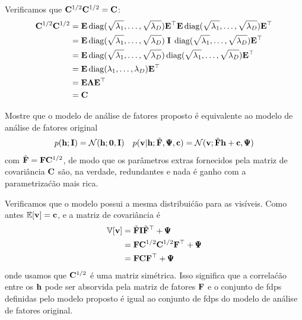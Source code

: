 \begin{exenumerate}
    \begin{solution}
        Verificamos que $\mathbf{C}^{1/2}\mathbf{C}^{1/2} = \mathbf{C}$:
        \begin{align}
            \mathbf{C}^{1/2} \mathbf{C}^{1/2} & = \mathbf{E} \operatorname{diag}(\sqrt{\lambda_1}, \ldots, \sqrt{\lambda_D})\mathbf{E}^\top \mathbf{E} \operatorname{diag}(\sqrt{\lambda_1}, \ldots, \sqrt{\lambda_D})\mathbf{E}^\top\\
            & = \mathbf{E} \operatorname{diag}(\sqrt{\lambda_1}, \ldots, \sqrt{\lambda_D}) \; \mathbf{I} \; \operatorname{diag}(\sqrt{\lambda_1}, \ldots, \sqrt{\lambda_D})\mathbf{E}^\top\\
            &= \mathbf{E} \operatorname{diag}(\sqrt{\lambda_1}, \ldots, \sqrt{\lambda_D}) \operatorname{diag}(\sqrt{\lambda_1}, \ldots, \sqrt{\lambda_D})\mathbf{E}^\top\\
            &= \mathbf{E} \operatorname{diag}(\lambda_1, \ldots, \lambda_D) \mathbf{E}^\top\\
            &= \mathbf{E} \mathbf{\Lambda} \mathbf{E}^\top\\
            & =\mathbf{C}
        \end{align}
        
    \end{solution}
    
    \item Mostre que o modelo de an\'alise de fatores proposto \'e equivalente ao modelo de an\'alise de fatores original
    \begin{align}
        p(\mathbf{h}; \mathbf{I}) &= \mathcal{N}(\mathbf{h}; \boldsymbol{0}, \mathbf{I}) & p(\mathbf{v} | \mathbf{h}; \tilde{\mathbf{F}}, \pmb{\Psi}, \mathbf{c}) = \mathcal{N}(\mathbf{v}; \tilde{\mathbf{F}} \mathbf{h}+\mathbf{c}, \pmb{\Psi})
    \end{align}
    com $\tilde{\mathbf{F}} = \mathbf{F} \mathbf{C}^{1/2}$, de modo que os par\^ametros extras fornecidos
    pela matriz de covari\^ancia $\mathbf{C}$ s\~ao, na verdade, redundantes e nada \'e ganho com a parametriza\'c\~ao mais rica. 
    
    \begin{solution}
        Verificamos que o modelo possui a mesma distribui\'c\~ao para as vis\'iveis. Como antes $\mathbb{E}[\mathbf{v}] = \mathbf{c}$, e a matriz de covari\^ancia \'e
        \begin{align}
            \mathbb{V}[\mathbf{v}] & = \tilde{\mathbf{F}} \mathbf{I} \tilde{\mathbf{F}}^\top + \pmb{\Psi}\\
            & =  \mathbf{F} \mathbf{C}^{1/2} \mathbf{C}^{1/2}  \mathbf{F}^\top + \pmb{\Psi}\\
            & =  \mathbf{F} \mathbf{C}  \mathbf{F}^\top + \pmb{\Psi}
        \end{align}
        onde usamos que $\mathbf{C}^{1/2}$ \'e uma matriz sim\'etrica. Isso significa
        que a correla\'c\~ao entre os $\mathbf{h}$ pode ser absorvida pela
        matriz de fatores $\mathbf{F}$ e o conjunto de fdps definidas pelo modelo
        proposto \'e igual ao conjunto de fdps do modelo de an\'alise de fatores original.
        

\end{solution}
\end{exenumerate}
